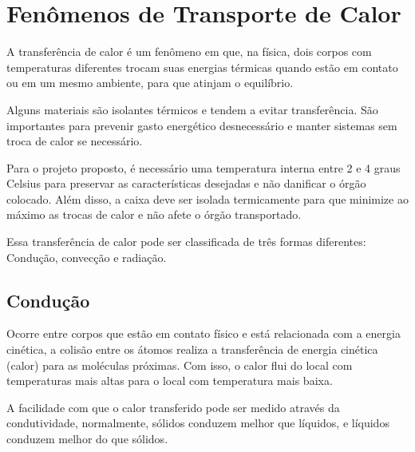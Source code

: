 \section{Fenômenos de Transporte de Calor}

A transferência de calor é um fenômeno em que, na física, dois corpos com temperaturas diferentes trocam suas energias térmicas quando estão em contato ou em um mesmo ambiente, para que atinjam o equilíbrio.

Alguns materiais são isolantes térmicos e tendem a evitar transferência. São importantes para prevenir gasto energético desnecessário e manter sistemas sem troca de calor se necessário.

Para o projeto proposto, é necessário uma temperatura interna entre 2 e 4 graus Celsius para preservar as características desejadas e não danificar o órgão colocado. Além disso, a caixa deve ser isolada termicamente para que minimize ao máximo as trocas de calor e não afete o órgão transportado.

Essa transferência de calor pode ser classificada de três formas diferentes: Condução, convecção e radiação.

\subsection{Condução}
Ocorre entre corpos que estão em contato físico e está relacionada com a energia cinética, a colisão entre os átomos realiza a transferência de energia cinética (calor) para as moléculas próximas. Com isso, o calor flui do local com temperaturas mais altas para o local com temperatura mais baixa.

A facilidade com que o calor transferido pode ser medido através da condutividade, normalmente, sólidos conduzem melhor que líquidos, e líquidos conduzem melhor do que sólidos.

